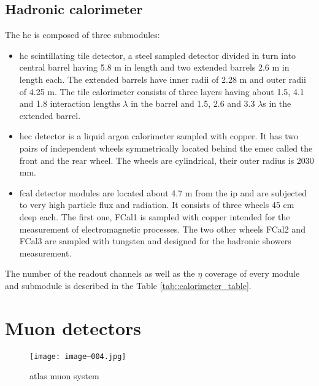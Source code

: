 	\subsection{Hadronic calorimeter }
	        The \gls{hc} is composed of three submodules:
	\begin{itemize}
		\item \gls{hc} scintillating tile detector, a steel sampled detector divided in turn into central barrel having 5.8 m in length and two extended barrels 2.6 m in length each. The extended barrels have inner radii of 2.28 m and outer radii of 4.25 m.  The tile calorimeter consists of three layers having about 1.5, 4.1 and 1.8 interaction lengths $\lambda$ in the barrel and 1.5, 2.6 and 3.3 $\lambda$s in the extended barrel. 
		\item \gls{hec} detector is a liquid argon calorimeter sampled with copper. It has two pairs of independent wheels symmetrically located behind the \gls{emec} called the front and the rear wheel. The wheels are cylindrical, their outer radius is 2030 mm. 
		\item \gls{fcal} detector modules are located about 4.7 m from the \gls{ip} and are subjected to very high particle flux and radiation. It consists of three wheels 45 cm deep each. The first one, FCal1 is sampled with copper intended for the measurement of electromagnetic processes. The two other wheels FCal2 and FCal3 are sampled with tungsten and designed for the hadronic showers measurement.
	\end{itemize}
	The number of the readout channels as well as the $\eta$ coverage of every module and submodule is described in the Table \ref{tab::calorimeter_table}.
	
\section{Muon detectors}
\label{sect::muons}
    \begin{figure}[htpb]
	\texttt{[image: image--004.jpg]}
	\caption{ \gls{atlas} muon system}
	\label{fig::muon_layout}
	\end{figure}

